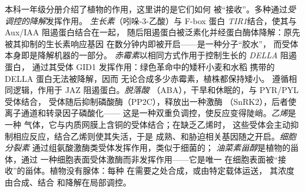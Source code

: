 \begin{definition}[植物激素及其受体]\label{def:b3:plant-molecular-physiology:hormones}
本科一年级分册介绍了植物的作用，这里讲的是它们如何
被“接收”。多种通过\emph{受调控的降解}发挥作用。
\emph{生长素}（吲哚-3-乙酸）与 F-box 蛋白
\emph{TIR1}结合，使其与 Aux/IAA 阻遏蛋白结合在一起，
随后阻遏蛋白被泛素化并经蛋白酶体降解：原先被其抑制的生长素响应基因
在数分钟内即被开启——是一种分子“胶水”，
而受体本身即是降解机器的一部分。
\emph{赤霉素}以相同方式作用于控制生长的 \emph{DELLA} 阻遏蛋白，
通过其受体 GID1 发挥作用：绿色革命中的矮秆小麦和水稻
携带的 DELLA 蛋白无法被降解，因而
无论合成多少赤霉素，植株都保持矮小。\emph{}
遵循相同逻辑，作用于 JAZ 阻遏蛋白。\emph{脱落酸}
（ABA），干旱和休眠的，与 PYR/PYL 受体结合，
受体随后抑制磷酸酶（PP2C），释放出一种激酶
（SnRK2），后者使离子通道和转录因子磷酸化——
这是一种双重负调控，使反应变得陡峭。\emph{乙烯}是一种
气体，它与内质网膜上含铜的受体结合；在缺乏乙烯时，
这些受体会主动抑制相应反应，结合乙烯则使其失活，于是
成熟、和胁迫相关基因随之开启。\emph{细胞分裂素}
通过组氨酸激酶类受体发挥作用，类似于细菌的；
\emph{油菜素甾醇}是植物的甾体，通过
一种细胞表面受体激酶而非发挥作用——它是唯一
在细胞表面被“接收”的甾体。植物没有腺体：每种
在需要之处合成，或由特定载体运送，
其浓度由合成、结合
和降解在局部调控。
\end{definition}

